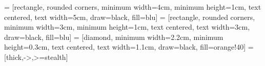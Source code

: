 \usepackage[T1]{fontenc}
\usepackage{times,newtxmath,newtxtext}
\usepackage[utf8]{inputenc}
\usepackage{subcaption}
\usepackage{setspace}
\usepackage{multirow}
\usepackage{multicol}
\usepackage[tableposition=top]{caption}
\usepackage[table,xcdraw]{xcolor}
\usepackage{titlesec}
\usepackage{indentfirst}
\usepackage{enumitem}
\usepackage{overpic}
\usepackage{tikz}

\setlength{\parindent}{1cm}

\captionsetup[table]{labelsep=space}
\captionsetup[figure]{labelsep=space}

\usetikzlibrary{shapes.geometric, arrows}
 = [rectangle, rounded corners, minimum width=4cm, minimum height=1cm, text centered, text width=5cm, draw=black, fill=blu]
 = [rectangle, rounded corners, minimum width=3cm, minimum height=1cm, text centered, text width=3cm, draw=black, fill=blu]
 = [diamond, minimum width=2.2cm, minimum height=0.3cm, text centered, text width=1.1cm, draw=black, fill=orange!40]
 = [thick,->,>=stealth]

\usepackage{gensymb}
\usepackage{notoccite}
\usepackage{float}
\usepackage{hyperref}
\hypersetup{
    colorlinks,
    citecolor=black,
    filecolor=black,
    linkcolor=black,
    urlcolor=black,
    linkbordercolor=red
}
\usepackage{indentfirst}
\usepackage{amsmath}